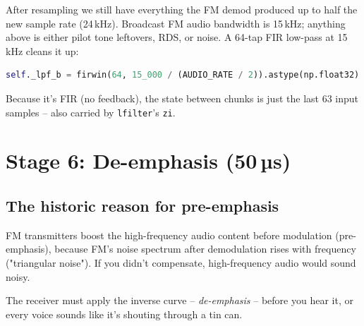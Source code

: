 \documentclass[11pt,a4paper]{article}
\begin{document}
After resampling we still have everything the FM demod produced up to
half the new sample rate (24\,kHz).  Broadcast FM audio bandwidth is
15\,kHz; anything above is either pilot tone leftovers, RDS, or noise.
A 64-tap FIR low-pass at 15\,kHz cleans it up:

\begin{lstlisting}[language=Python]
self._lpf_b = firwin(64, 15_000 / (AUDIO_RATE / 2)).astype(np.float32)
\end{lstlisting}

\begin{center}
\end{center}

Because it's FIR (no feedback), the state between chunks is just the
last 63 input samples -- also carried by \texttt{lfilter}'s \texttt{zi}.

\section{Stage 6: De-emphasis (50\,µs)}

\subsection{The historic reason for pre-emphasis}

FM transmitters boost the high-frequency audio content before
modulation (pre-emphasis), because FM's noise spectrum after
demodulation rises with frequency ("triangular noise").  If you didn't
compensate, high-frequency audio would sound noisy.

The receiver must apply the inverse curve -- \emph{de-emphasis} --
before you hear it, or every voice sounds like it's shouting through a
tin can.
\end{document}
